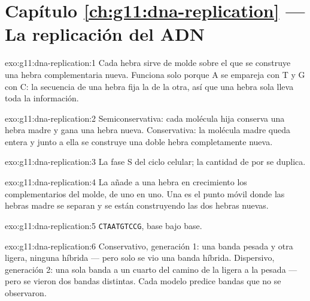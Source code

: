 \section*{Capítulo \ref{ch:g11:dna-replication} --- La replicación del ADN}

\begin{solution}{exo:g11:dna-replication:1}
Cada hebra sirve de molde sobre el que se construye una hebra
complementaria nueva. Funciona solo porque A se empareja con T y G con
C: la secuencia de una hebra fija la de la otra, así que una hebra sola
lleva toda la información.
\end{solution}

\begin{solution}{exo:g11:dna-replication:2}
Semiconservativa: cada molécula hija conserva una hebra madre y gana
una hebra nueva. Conservativa: la molécula madre queda entera y junto a
ella se construye una doble hebra completamente nueva.
\end{solution}

\begin{solution}{exo:g11:dna-replication:3}
La fase S del ciclo celular; la cantidad de  por  se duplica.
\end{solution}

\begin{solution}{exo:g11:dna-replication:4}
La  añade a una hebra en crecimiento los 
complementarios del molde, de uno en uno. Una 
es el punto móvil donde las hebras madre se separan y se están
construyendo las dos hebras nuevas.
\end{solution}

\begin{solution}{exo:g11:dna-replication:5}
\texttt{CTAATGTCCG}, base bajo base.
\end{solution}

\begin{solution}{exo:g11:dna-replication:6}
Conservativo, generación 1: una banda pesada y otra ligera, ninguna
híbrida --- pero solo se vio una banda híbrida. Dispersivo, generación
2: una sola banda a un cuarto del camino de la ligera a la pesada ---
pero se vieron dos bandas distintas. Cada modelo predice bandas que no
se observaron.
\end{solution}

